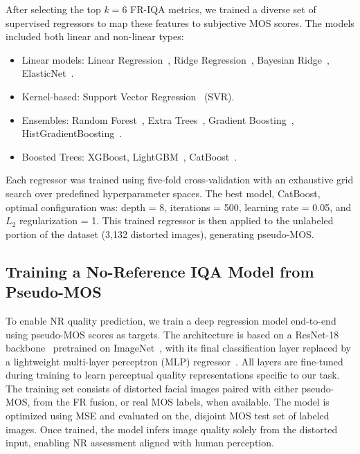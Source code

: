After selecting the top $k = 6$ FR-IQA metrics, we trained a diverse set of supervised regressors to map these features to subjective MOS scores. The models included both linear and non-linear types:

\begin{itemize}
    \item Linear models: Linear Regression~\cite{linearregression}, Ridge Regression~\cite{ridgeregression}, Bayesian Ridge~\cite{bayesianridge}, ElasticNet~\cite{elasticnet}.
    \item Kernel-based: Support Vector Regression~\cite{svr} (SVR).
    \item Ensembles: Random Forest~\cite{randomforest}, Extra Trees~\cite{ensembles}, Gradient Boosting~\cite{gradboosting}, HistGradientBoosting~\cite{histboost}.
    \item Boosted Trees: XGBoost\cite{xgboost}, LightGBM~\cite{lightgbm}, CatBoost~\cite{catboost}.
\end{itemize}

Each regressor was trained using five-fold cross-validation with an exhaustive grid search over predefined hyperparameter spaces. The best model, CatBoost, optimal configuration was: depth = 8, iterations = 500, learning rate = 0.05, and $L_2$ regularization = 1. This trained regressor is then applied to the unlabeled portion of the dataset (3,132 distorted images), generating pseudo-MOS.\@

\subsection{Training a No-Reference IQA Model from Pseudo-MOS}

To enable NR quality prediction, we train a deep regression model end-to-end using pseudo-MOS scores as targets. The architecture is based on a ResNet-18 backbone~\cite{resnet} pretrained on ImageNet~\cite{imagenet}, with its final classification layer replaced by a lightweight multi-layer perceptron (MLP) regressor~\cite{bayesianridge}. All layers are fine-tuned during training to learn perceptual quality representations specific to our task. The training set consists of distorted facial images paired with either pseudo-MOS, from the FR fusion, or real MOS labels, when available. The model is optimized using MSE and evaluated on the, disjoint MOS test set of labeled images. Once trained, the model infers image quality solely from the distorted input, enabling NR assessment aligned with human perception.

